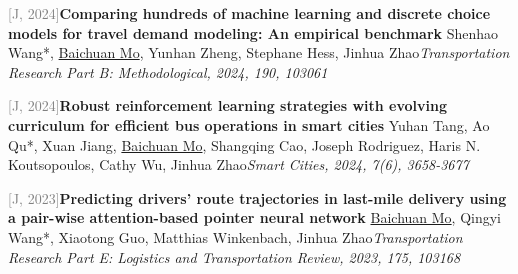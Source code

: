 \par\noindent\begin{minipage}{\linewidth}
{\textcolor{gray}{[J\themyCounter, 2024]\;}}{\textbf{Comparing hundreds of machine learning and discrete choice models for travel demand modeling: An empirical benchmark} \href{https://doi.org/10.1016/j.trb.2024.103061}{\textcolor{cadmiumorange}{\faExternalLink}}}{\newline Shenhao Wang*, \underline{Baichuan Mo}, Yunhan Zheng, Stephane Hess, Jinhua Zhao}{\newline \emph{Transportation Research Part B: Methodological, 2024, 190, 103061}}{{\;     }}{}
\end{minipage}\par\vspace{5.5pt}


\par\noindent\begin{minipage}{\linewidth}
{\textcolor{gray}{[J\themyCounter, 2024]\;}}{\textbf{Robust reinforcement learning strategies with evolving curriculum for efficient bus operations in smart cities} \href{https://doi.org/10.3390/smartcities7060141}{\textcolor{cadmiumorange}{\faExternalLink}}}{\newline Yuhan Tang, Ao Qu*, Xuan Jiang, \underline{Baichuan Mo}, Shangqing Cao, Joseph Rodriguez, Haris N. Koutsopoulos, Cathy Wu, Jinhua Zhao}{\newline \emph{Smart Cities, 2024, 7(6), 3658-3677}}{{\;    }}{}
\end{minipage}\par\vspace{5.5pt}


\par\noindent\begin{minipage}{\linewidth}
{\textcolor{gray}{[J\themyCounter, 2023]\;}}{\textbf{Predicting drivers' route trajectories in last-mile delivery using a pair-wise attention-based pointer neural network} \href{https://doi.org/10.1016/j.tre.2023.103168}{\textcolor{cadmiumorange}{\faExternalLink}}}{\newline \underline{Baichuan Mo}, Qingyi Wang*, Xiaotong Guo, Matthias Winkenbach, Jinhua Zhao}{\newline \emph{Transportation Research Part E: Logistics and Transportation Review, 2023, 175, 103168}}{{\;     }}{}
\end{minipage}\par\vspace{5.5pt}


